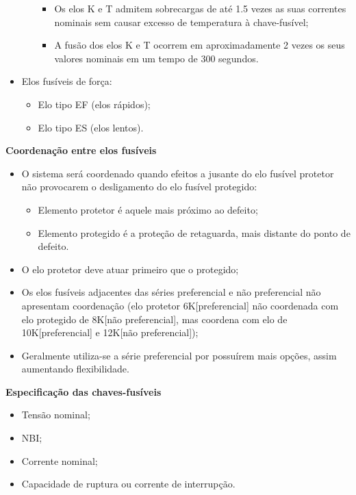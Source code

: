 \begin{itemize}
\begin{itemize}
\begin{itemize}
\begin{itemize}
            \end{itemize}
            \item Os elos K e T admitem sobrecargas de até 1.5 vezes as suas correntes nominais sem causar excesso de temperatura à chave-fusível;
            \item A fusão dos elos K e T ocorrem em aproximadamente 2 vezes os seus valores nominais em um tempo de 300 segundos.
        \end{itemize}
    \end{itemize}
   \item Elos fusíveis de força:
   \begin{itemize}
        \item Elo tipo EF (elos rápidos);
        \item Elo tipo ES (elos lentos).
    \end{itemize}
\end{itemize}

\textbf{Coordenação entre elos fusíveis}

\begin{itemize}
    \item O sistema será coordenado quando efeitos a jusante do elo fusível protetor não provocarem o desligamento do elo fusível protegido:
    \begin{itemize}
        \item Elemento protetor é aquele mais próximo ao defeito;
        \item Elemento protegido é a proteção de retaguarda, mais distante do ponto de defeito.
    \end{itemize}
    \item O elo protetor deve atuar primeiro que o protegido;
    \item Os elos fusíveis adjacentes das séries preferencial e não preferencial não apresentam coordenação (elo protetor 6K[preferencial] não coordenada com elo protegido de 8K[não preferencial], mas coordena com elo de 10K[preferencial] e 12K[não preferencial]);
    \item Geralmente utiliza-se a série preferencial por possuírem mais opções, assim aumentando flexibilidade.
\end{itemize}

\textbf{Especificação das chaves-fusíveis}

\begin{itemize}
    \item Tensão nominal;
    \item NBI;
    \item Corrente nominal;
    \item Capacidade de ruptura ou corrente de interrupção.
\end{itemize}

